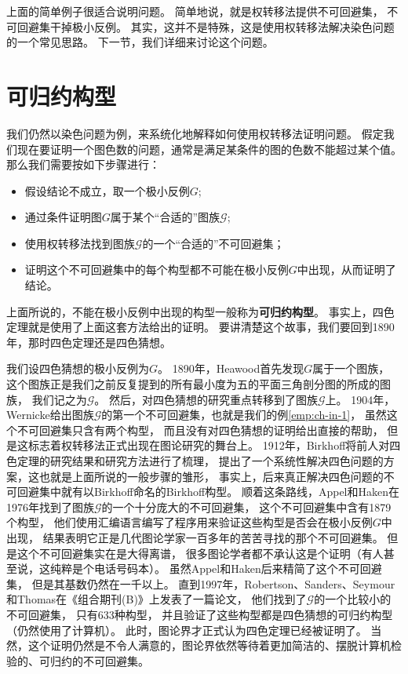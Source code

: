 \documentclass[cn,fancy,blue,11pt]{elegantbook}
\begin{document}
上面的简单例子很适合说明问题。
简单地说，就是权转移法提供不可回避集，
不可回避集干掉极小反例。
其实，这并不是特殊，这是使用权转移法解决染色问题的一个常见思路。
下一节，我们详细来讨论这个问题。

\section{可归约构型}

我们仍然以染色问题为例，来系统化地解释如何使用权转移法证明问题。
假定我们现在要证明一个图色数的问题，通常是满足某条件的图的色数不能超过某个值。
那么我们需要按如下步骤进行：
\begin{framed}
	\begin{itemize}
		\item 假设结论不成立，取一个极小反例$G$;
		\item 通过条件证明图$G$属于某个``合适的''图族$\mathcal{G}$;
		\item 使用权转移法找到图族$\mathcal{G}$的一个``合适的''不可回避集；
		\item 证明这个不可回避集中的每个构型都不可能在极小反例$G$中出现，从而证明了结论。
	\end{itemize}
\end{framed}

上面所说的，不能在极小反例中出现的构型一般称为\textbf{可归约构型}。
事实上，四色定理就是使用了上面这套方法给出的证明。
要讲清楚这个故事，我们要回到1890年，那时四色定理还是四色猜想。

我们设四色猜想的极小反例为$G$。
1890年，Heawood首先发现$G$属于一个图族，
这个图族正是我们之前反复提到的所有最小度为五的平面三角剖分图的所成的图族，
我们记之为$\mathcal{G}$。
然后，对四色猜想的研究重点转移到了图族$\mathcal{G}$上。
1904年，Wernicke给出图族$\mathcal{G}$的第一个不可回避集，也就是我们的例\ref{emp:ch-in-1}，
虽然这个不可回避集只含有两个构型，
而且没有对四色猜想的证明给出直接的帮助，
但是这标志着权转移法正式出现在图论研究的舞台上。
1912年，Birkhoff将前人对四色定理的研究结果和研究方法进行了梳理，
提出了一个系统性解决四色问题的方案，这也就是上面所说的一般步骤的雏形，
事实上，后来真正解决四色问题的不可回避集中就有以Birkhoff命名的Birkhoff构型。
顺着这条路线，Appel和Haken在1976年找到了图族$\mathcal{G}$的一个十分庞大的不可回避集，
这个不可回避集中含有1879个构型，
他们使用汇编语言编写了程序用来验证这些构型是否会在极小反例$G$中出现，
结果表明它正是几代图论学家一百多年的苦苦寻找的那个不可回避集。
但是这个不可回避集实在是大得离谱，
很多图论学者都不承认这是个证明（有人甚至说，这纯粹是个电话号码本）。
虽然Appel和Haken后来精简了这个不可回避集，
但是其基数仍然在一千以上。
直到1997年，Robertson、Sanders、Seymour和Thomas在《组合期刊(B)》上发表了一篇论文，
他们找到了$\mathcal{G}$的一个比较小的不可回避集，
只有633种构型，
并且验证了这些构型都是四色猜想的可归约构型（仍然使用了计算机）。
此时，图论界才正式认为四色定理已经被证明了。
当然，这个证明仍然是不令人满意的，图论界依然等待着更加简洁的、摆脱计算机检验的、可归约的不可回避集。
\end{document}
